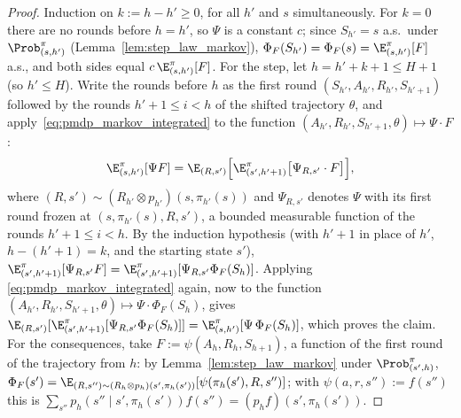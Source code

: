 \begin{proof}
\leanok
Induction on $k := h - h' \ge 0$, for all $h'$ and $s$ simultaneously. For $k = 0$ there are
no rounds before $h = h'$, so $\Psi$ is a constant $c$; since $S_{h'} = s$ a.s.\ under
$\Prob^\pi_{(s,h')}$ (Lemma~\ref{lem:step_law_markov}), $\Phi_F(S_{h'}) = \Phi_F(s) =
\E^\pi_{(s,h')}[F]$ a.s., and both sides equal $c\,\E^\pi_{(s,h')}[F]$. For the step, let
$h = h' + k + 1 \le H + 1$ (so $h' \le H$). Write the rounds before $h$ as the first round
$(S_{h'}, A_{h'}, R_{h'}, S_{h'+1})$ followed by the rounds $h' + 1 \le i < h$ of the shifted
trajectory $\theta$, and apply~\eqref{eq:pmdp_markov_integrated} to the function
$(A_{h'}, R_{h'}, S_{h'+1}, \theta) \mapsto \Psi\cdot F$:
\[
  \E^\pi_{(s,h')}[\Psi F]
  = \E_{(R,s')}\Big[\E^\pi_{(s',h'+1)}\big[\Psi_{R,s'}\cdot F\big]\Big],
\]
where $(R, s') \sim (R_{h'} \otimes p_{h'})(s, \pi_{h'}(s))$ and $\Psi_{R,s'}$ denotes $\Psi$
with its first round frozen at $(s, \pi_{h'}(s), R, s')$, a bounded measurable function of the
rounds $h' + 1 \le i < h$. By the induction hypothesis (with $h' + 1$ in place of $h'$,
$h - (h' + 1) = k$, and the starting state $s'$),
$\E^\pi_{(s',h'+1)}[\Psi_{R,s'} F] = \E^\pi_{(s',h'+1)}[\Psi_{R,s'}\Phi_F(S_h)]$. Applying
\eqref{eq:pmdp_markov_integrated} again, now to the function
$(A_{h'}, R_{h'}, S_{h'+1}, \theta) \mapsto \Psi\cdot\Phi_F(S_h)$, gives
$\E_{(R,s')}[\E^\pi_{(s',h'+1)}[\Psi_{R,s'}\Phi_F(S_h)]] = \E^\pi_{(s,h')}[\Psi\,\Phi_F(S_h)]$,
which proves the claim. For the consequences, take $F := \psi(A_h, R_h, S_{h+1})$, a function
of the first round of the trajectory from $h$: by Lemma~\ref{lem:step_law_markov} under
$\Prob^\pi_{(s',h)}$, $\Phi_F(s') = \E_{(R,s'') \sim (R_h\otimes p_h)(s', \pi_h(s'))}[\psi(\pi_h(s'), R, s'')]$;
with $\psi(a, r, s'') := f(s'')$ this is $\sum_{s''} p_h(s'' \mid s', \pi_h(s')) f(s'') = (p_h f)(s', \pi_h(s'))$.
\end{proof}


